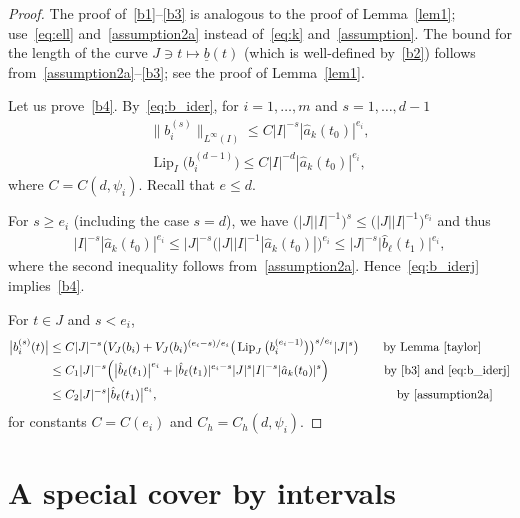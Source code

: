 \documentclass[pdftex]{sigma}
\numberwithin{equation}{section}
\def\ps{\psi}
\def\ul{\underline}
\def\Lip{\on{Lip}}
\def\we{\hat}
\let\on=\operatorname
\begin{document}
\begin{proof}
 The proof of~\eqref{b1}--\eqref{b3} is analogous to the proof of Lemma~\ref{lem1}; use~\eqref{eq:ell} and~\eqref{assumption2a}
 instead of~\eqref{eq:k} and~\eqref{assumption}. The bound for the length of the curve $J \ni t \mapsto \ul b(t)$ (which is
 well-defined by~\eqref{b2})
 follows from~\eqref{assumption2a}--\eqref{b3}; see the proof of Lemma~\ref{lem1}.

 Let us prove~\eqref{b4}. By~\eqref{eq:b_ider}, for $i = 1,\dots,m$ and $s= 1,\dots,d-1$
 \begin{gather}
 \big\| b_i^{(s)} \big\|_{L^\infty(I)} \le C |I|^{-s} |\we a_k (t_0)|^{e_i},\nonumber
 \\
 \Lip_I\big( b_i^{(d-1)}\big) \le C |I|^{-d} | \we a_k (t_0)|^{e_i},
 \label{eq:b_iderj}
 \end{gather}
 where $C = C(d, \ps_i)$. Recall that $e \le d$.

 For $s\ge e_i$ (including the case $s = d$), we have $\big(|J||I|^{-1}\big)^s \le \big(|J||I|^{-1}\big)^{e_i}$ and thus
 \begin{gather*}
 | I |^{-s} |\we a_k(t_0)|^{e_i}
 \le | J |^{-s} \big(|J| |I|^{-1} |\we a_k(t_0)| \big)^{e_i}
 \le | J |^{-s} \big|\we b_\ell(t_1)\big|^{e_i},
 \end{gather*}
 where the second inequality follows from~\eqref{assumption2a}. Hence~\eqref{eq:b_iderj} implies~\eqref{b4}.


 For $t\in J$ and $s< e_i$,
 \begin{align*}
 \big|b_i^{(s)}(t) \big|
 &\le C | J |^{-s} \bigl ( V_J(b_i)
 + V_J(b_i)^{(e_i-s)/e_i} \big(\Lip_J \big(b_i^{(e_i-1)}\big)\big)^{s/e_i} |J|^s \bigr)
 \hspace{7mm} \text{by Lemma~\ref{taylor}}
 \\
 &\le C_1 | J |^{-s} \Bigl ( \big|\we b_\ell(t_1)\big|^{e_i}
 + |\we b_\ell(t_1)|^{e_i-s} |J|^s |I|^{-s} |\we a_k(t_0)|^{s} \Bigr)
 \hspace{16mm} \text{by~\eqref{b3} and~\eqref{eq:b_iderj}}
 \\
 &\le C_2 | J |^{-s} \big|\we b_\ell(t_1)\big|^{e_i}, \hspace{69mm} \text{by~\eqref{assumption2a}}
 \end{align*}
 for constants $C = C(e_i)$ and $C_h = C_h(d,\ps_i)$.
\end{proof}


\section{A special cover by intervals} %
\end{document}
